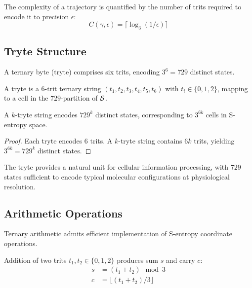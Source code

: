 \begin{corollary}
The complexity of a trajectory is quantified by the number of trits required to encode it to precision $\epsilon$:
\begin{equation}
C(\gamma, \epsilon) = \lceil \log_3(1/\epsilon) \rceil
\end{equation}
\end{corollary}

\subsection{Tryte Structure}

A ternary byte (tryte) comprises six trits, encoding $3^6 = 729$ distinct states.

\begin{definition}[Tryte]
A tryte is a $6$-trit ternary string $(t_1,t_2,t_3,t_4,t_5,t_6)$ with $t_i \in \{0,1,2\}$, mapping to a cell in the $729$-partition of $\mathcal{S}$.
\end{definition}

\begin{proposition}
A $k$-tryte string encodes $729^k$ distinct states, corresponding to $3^{6k}$ cells in S-entropy space.
\end{proposition}

\begin{proof}
Each tryte encodes $6$ trits. A $k$-tryte string contains $6k$ trits, yielding $3^{6k} = 729^k$ distinct states.
\end{proof}

The tryte provides a natural unit for cellular information processing, with $729$ states sufficient to encode typical molecular configurations at physiological resolution.

\subsection{Arithmetic Operations}

Ternary arithmetic admits efficient implementation of S-entropy coordinate operations.

\begin{definition}
Addition of two trits $t_1, t_2 \in \{0,1,2\}$ produces sum $s$ and carry $c$:
\begin{align}
s &= (t_1 + t_2) \mod 3 \\
c &= \lfloor (t_1 + t_2) / 3 \rfloor
\end{align}
\end{definition}

